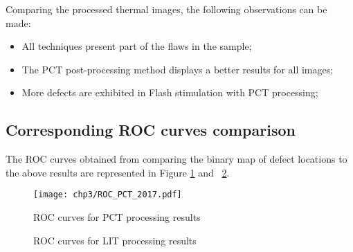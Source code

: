 Comparing the processed thermal images, the following observations can be made:  
\begin{itemize}
    \item All techniques present part of the flaws in the sample;
    \item The PCT post-processing method displays a better results for all images;
    \item More defects are exhibited in Flash stimulation with PCT processing;
\end{itemize}


\subsection{Corresponding ROC curves comparison}
The ROC curves obtained from comparing the binary map of defect locations to the above results are represented in Figure \ref{roc_pct} and ~\ref{ROC_curve}.
\begin{figure}[htbp]
   \centering
   \texttt{[image: chp3/ROC\_PCT\_2017.pdf]}
   \caption{ROC curves for PCT processing results}
   \label{roc_pct}
\end{figure}


\begin{figure}[ht]
    \centering
    \hspace{10pt}
    \caption{ROC curves for LIT processing results}
    \label{ROC_curve}
\end{figure}

